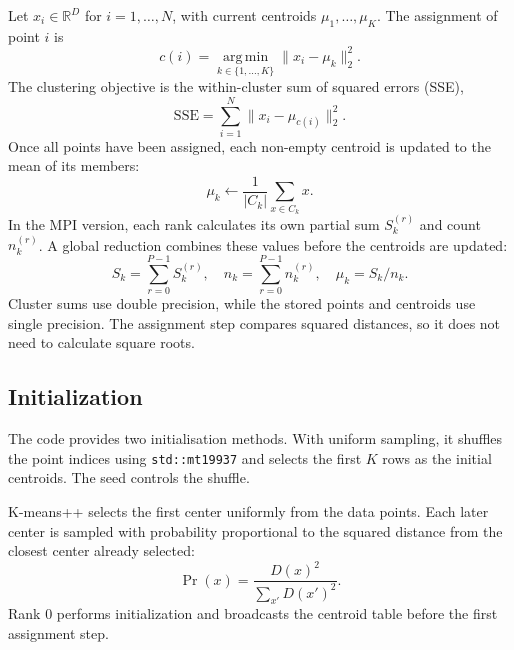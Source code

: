 \documentclass[conference]{IEEEtran}
\DeclareRobustCommand{\code}[1]{\texttt{#1}}
\begin{document}
Let $x_i \in \mathbb{R}^{D}$ for $i = 1,\ldots,N$, with current centroids $\mu_1,\ldots,\mu_K$. The assignment of point $i$ is
\begin{equation}
  c(i) = \operatorname*{arg\,min}_{k \in \{1,\ldots,K\}}
           \big\| x_i - \mu_k \big\|_2^2 .
  \label{eq:assign}
\end{equation}
The clustering objective is the within-cluster sum of squared errors (SSE),
\begin{equation}
  \mathrm{SSE} = \sum_{i=1}^{N} \big\| x_i - \mu_{c(i)} \big\|_2^2 .
  \label{eq:sse}
\end{equation}
Once all points have been assigned, each non-empty centroid is updated to the mean of its members:
\begin{equation}
  \mu_k \leftarrow \frac{1}{|C_k|} \sum_{x \in C_k} x .
  \label{eq:update}
\end{equation}
In the MPI version, each rank calculates its own partial sum $S_k^{(r)}$ and count $n_k^{(r)}$. A global reduction combines these values before the centroids are updated:
\begin{equation}
  S_k = \sum_{r=0}^{P-1} S_k^{(r)}, \quad
  n_k = \sum_{r=0}^{P-1} n_k^{(r)}, \quad
  \mu_k = S_k / n_k .
  \label{eq:reduce}
\end{equation}
Cluster sums use double precision, while the stored points and centroids use single precision. The assignment step compares squared distances, so it does not need to calculate square roots.

\subsection{Initialization}

The code provides two initialisation methods. With uniform sampling, it shuffles the point indices using \code{std::mt19937} and selects the first $K$ rows as the initial centroids. The seed controls the shuffle.

K-means++ \cite{arthur2007} selects the first center uniformly from the data points. Each later center is sampled with probability proportional to the squared distance from the closest center already selected:
\begin{equation}
  \Pr(x) = \frac{D(x)^2}{\sum_{x'} D(x')^2} .
  \label{eq:kpp}
\end{equation}
Rank 0 performs initialization and broadcasts the centroid table before the first assignment step.

\end{document}
